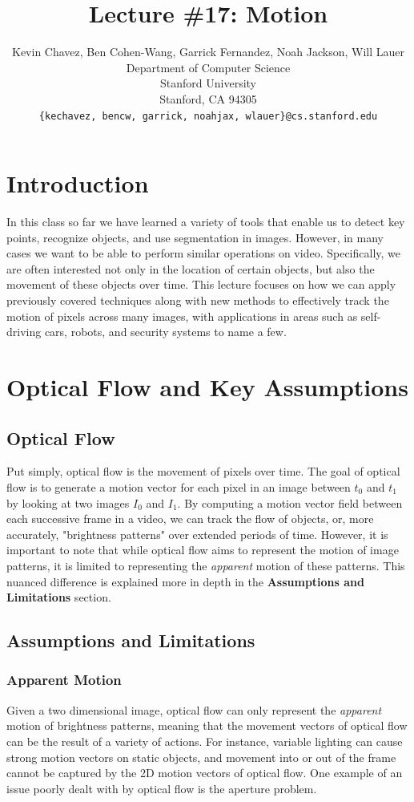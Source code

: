 \documentclass{article}
\title{Lecture \#17: Motion}
\author{
  Kevin Chavez, Ben Cohen-Wang, Garrick Fernandez, Noah Jackson, Will Lauer \\
  Department of Computer Science\\
  Stanford University\\
  Stanford, CA 94305 \\
  \texttt{\{kechavez, bencw, garrick, noahjax, wlauer\}@cs.stanford.edu} \\
}
\begin{document}
\maketitle

\section{Introduction}
In this class so far we have learned a variety of tools that enable us to detect key points, recognize objects, and use segmentation in images. However, in many cases we want to be able to perform similar operations on video. Specifically, we are often interested not only in the location of certain objects, but also the movement of these objects over time. This lecture focuses on how we can apply previously covered techniques along with new methods to effectively track the motion of pixels across many images, with applications in areas such as self-driving cars, robots, and security systems to name a few.


\section{Optical Flow and Key Assumptions}

\subsection{Optical Flow}
Put simply, optical flow is the movement of pixels over time. The goal of optical flow is to generate a motion vector for each pixel in an image between $t_0$ and $t_1$ by looking at two images $I_0$ and $I_1$. By computing a motion vector field between each successive frame in a video, we can track the flow of objects, or, more accurately, "brightness patterns" over extended periods of time. However, it is important to note that while optical flow aims to represent the motion of image patterns, it is limited to representing the \textit{apparent} motion of these patterns. This nuanced difference is explained more in depth in the \textbf{Assumptions and Limitations} section. 

\subsection{Assumptions and Limitations}

\subsubsection{Apparent Motion}
Given a two dimensional image, optical flow can only represent the \textit{apparent} motion of brightness patterns, meaning that the movement vectors of optical flow can be the result of a variety of actions. For instance, variable lighting can cause strong motion vectors on static objects, and movement into or out of the frame cannot be captured by the 2D motion vectors of optical flow. One example of an issue poorly dealt with by  optical flow is the aperture problem. 
\end{document}

